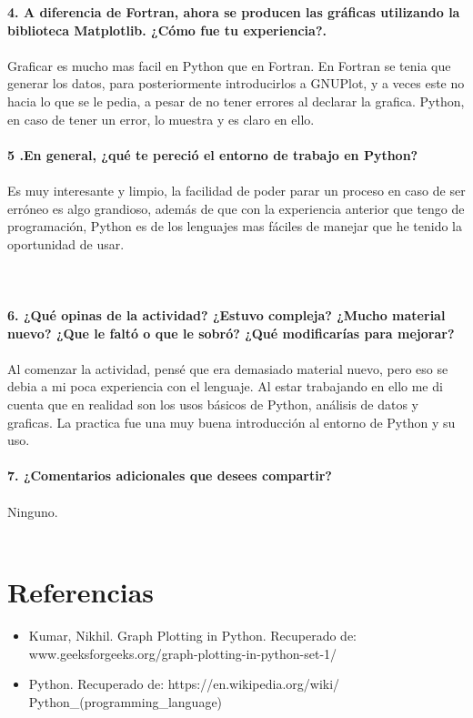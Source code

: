 \documentclass[12pt]{article}
\begin{document}
\noindent\textbf {4. A diferencia de Fortran, ahora se producen las gráficas utilizando la biblioteca Matplotlib. ¿Cómo fue tu experiencia?.} \\ \\
Graficar es mucho mas facil en Python que en Fortran. En Fortran se tenia que generar los datos, para posteriormente introducirlos a GNUPlot, y a veces este no hacia lo que se le pedia, a pesar de no tener errores al declarar la grafica. Python, en caso de tener un error, lo muestra y es claro en ello. \\ \\

\noindent\textbf {5 .En general, ¿qué te pereció el entorno de trabajo en Python?} \\ \\
Es muy interesante y limpio, la facilidad de poder parar un proceso en caso de ser erróneo es algo grandioso, además de que con la experiencia anterior que tengo de programación, Python es de los lenguajes mas fáciles de manejar que he tenido la oportunidad de usar.  \\ \\ \\ \\

\noindent\textbf {6. ¿Qué opinas de la actividad? ¿Estuvo compleja? ¿Mucho material nuevo? ¿Que le faltó o que le sobró? ¿Qué modificarías para mejorar?} \\ \\
Al comenzar la actividad, pensé que era demasiado material nuevo, pero eso se debia a mi poca experiencia con el lenguaje. Al estar trabajando en ello me di cuenta que en realidad son los usos básicos de Python, análisis de datos y graficas. La practica fue una muy buena introducción al entorno de Python y su uso. \\ \\

\noindent\textbf {7. ¿Comentarios adicionales que desees compartir?} \\ \\
Ninguno. \\ \\

\section{Referencias}
\begin{itemize}
\item Kumar, Nikhil. Graph Plotting in Python. Recuperado de: www.geeksforgeeks.org/graph-plotting-in-python-set-1/
\item Python. Recuperado de: https://en.wikipedia.org/wiki/\\Python\_(programming\_language)
\end{itemize}
\end{document}
